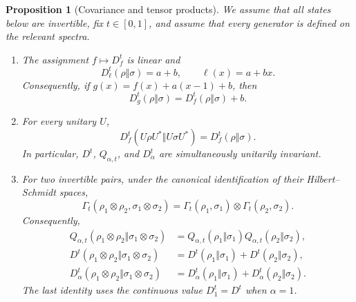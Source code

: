 \documentclass[11pt]{article}
\newtheorem{proposition}[proposition]{Proposition}
\theoremstyle{remark}
\newcommand{\1}{\mathbbm{1}}
\begin{document}
\begin{proposition}[Covariance and tensor products]
\label{rw:prop:elementary-structural-rules}
We assume that all states below are invertible, fix $t\in[0,1]$, and
assume that every generator is defined on the relevant spectra.
\begin{enumerate}[label=\textnormal{(\roman*)}]
\item The assignment $f\mapsto D_f^t$ is linear and
\begin{equation}
 D_\ell^t(\rho\Vert\sigma)=a+b,
 \qquad \ell(x)=a+bx.
 \label{rw:eq:affine-generator-normalization}
\end{equation}
Consequently, if $g(x)=f(x)+a(x-1)+b$, then
\begin{equation}
 D_g^t(\rho\Vert\sigma)=D_f^t(\rho\Vert\sigma)+b.
 \label{rw:eq:affine-generator-freedom}
\end{equation}

\item For every unitary $U$,
\begin{equation}
 D_f^t(U\rho U^*\Vert U\sigma U^*)
 =D_f^t(\rho\Vert\sigma).
 \label{rw:eq:unitary-invariance-Dft}
\end{equation}
In particular, $D^t$, $Q_{\alpha,t}$, and $D_\alpha^t$ are
simultaneously unitarily invariant.

\item For two invertible pairs, under the canonical identification of
their Hilbert--Schmidt spaces,
\begin{equation}
 \Gamma_t(\rho_1\otimes\rho_2,\sigma_1\otimes\sigma_2)
 =\Gamma_t(\rho_1,\sigma_1)\otimes
  \Gamma_t(\rho_2,\sigma_2).
 \label{rw:eq:Gamma-tensor-product}
\end{equation}
Consequently,
\begin{align}
 Q_{\alpha,t}(\rho_1\otimes\rho_2
       \Vert\sigma_1\otimes\sigma_2)
 &=Q_{\alpha,t}(\rho_1\Vert\sigma_1)
   Q_{\alpha,t}(\rho_2\Vert\sigma_2),
 \label{rw:eq:Qalpha-tensor-product}\\
 D^t(\rho_1\otimes\rho_2
       \Vert\sigma_1\otimes\sigma_2)
 &=D^t(\rho_1\Vert\sigma_1)
   +D^t(\rho_2\Vert\sigma_2),
 \label{rw:eq:Dt-tensor-product}\\
 D_\alpha^t(\rho_1\otimes\rho_2
       \Vert\sigma_1\otimes\sigma_2)
 &=D_\alpha^t(\rho_1\Vert\sigma_1)
   +D_\alpha^t(\rho_2\Vert\sigma_2).
 \label{rw:eq:Renyi-tensor-product}
\end{align}
The last identity uses the continuous value $D_1^t=D^t$ when
$\alpha=1$.
\end{enumerate}
\end{proposition}
\end{document}
